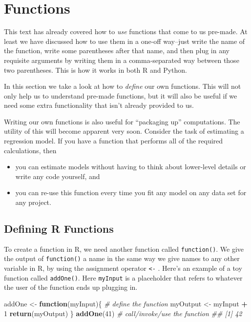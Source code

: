 \documentclass[12pt,krantz2]{krantz}
\makeatletter
\newenvironment{Shaded}{\begin{snugshade}}{\end{snugshade}}
\newcommand{\CommentTok}[1]{\textcolor[rgb]{0.37,0.37,0.37}{\textit{#1}}}
\newcommand{\ControlFlowTok}[1]{\textcolor[rgb]{0.27,0.27,0.27}{\textbf{#1}}}
\newcommand{\DecValTok}[1]{\textcolor[rgb]{0.06,0.06,0.06}{#1}}
\newcommand{\KeywordTok}[1]{\textcolor[rgb]{0.27,0.27,0.27}{\textbf{#1}}}
\newcommand{\NormalTok}[1]{#1}
\newcommand{\OperatorTok}[1]{\textcolor[rgb]{0.43,0.43,0.43}{\textbf{#1}}}
\newcommand{\StringTok}[1]{\textcolor[rgb]{0.5,0.5,0.5}{#1}}
\providecommand{\tightlist}{%
  \setlength{\itemsep}{0pt}\setlength{\parskip}{0pt}}
\newenvironment{kframe}{%
\medskip{}
\setlength{\fboxsep}{.8em}
 \def\at@end@of@kframe{}%
 \ifinner\ifhmode%
  \def\at@end@of@kframe{\end{minipage}}%
  \begin{minipage}{\columnwidth}%
 \fi\fi%
 \def\FrameCommand##1{\hskip\@totalleftmargin \hskip-\fboxsep
 \colorbox{shadecolor}{##1}\hskip-\fboxsep
     \hskip-\linewidth \hskip-\@totalleftmargin \hskip\columnwidth}%
 \MakeFramed {\advance\hsize-\width
   \@totalleftmargin\z@ \linewidth\hsize
   \@setminipage}}%
 {\par\unskip\endMakeFramed%
 \at@end@of@kframe}
\renewenvironment{Shaded}{\begin{kframe}}{\end{kframe}}
\makeatother
\begin{document}
\hypertarget{functions}{%
\chapter{Functions}\label{functions}}

This text has already covered how to \emph{use} functions that come to us pre-made. At least we have discussed how to use them in a one-off way--just write the name of the function, write some parentheses after that name, and then plug in any requisite arguments by writing them in a comma-separated way between those two parentheses. This is how it works in both R and Python.

In this section we take a look at how to \emph{define} our own functions. This will not only help us to understand pre-made functions, but it will also be useful if we need some extra functionality that isn't already provided to us.

Writing our own functions is also useful for ``packaging up'' computations. The utility of this will become apparent very soon. Consider the task of estimating a regression model. If you have a function that performs all of the required calculations, then

\begin{itemize}
\tightlist
\item
  you can estimate models without having to think about lower-level details or write any code yourself, and
\item
  you can re-use this function every time you fit any model on any data set for any project.
\end{itemize}

\hypertarget{defining-r-functions}{%
\section{Defining R Functions}\label{defining-r-functions}}

To create a function in R, we need another function called \texttt{function()}. We give the output of \texttt{function()} a name in the same way we give names to any other variable in R, by using the assignment operator \texttt{\textless{}-} . Here's an example of a toy function called \texttt{addOne()}. Here \texttt{myInput} is a placeholder that refers to whatever the user of the function ends up plugging in.

\begin{Shaded}
\begin{Highlighting}[]
\NormalTok{addOne <-}\StringTok{ }\ControlFlowTok{function}\NormalTok{(myInput)\{  }\CommentTok{# define the function}
\NormalTok{  myOutput <-}\StringTok{ }\NormalTok{myInput }\OperatorTok{+}\StringTok{ }\DecValTok{1}
  \KeywordTok{return}\NormalTok{(myOutput)}
\NormalTok{\}}
\KeywordTok{addOne}\NormalTok{(}\DecValTok{41}\NormalTok{) }\CommentTok{# call/invoke/use the function }
\CommentTok{## [1] 42}
\end{Highlighting}
\end{Shaded}
\end{document}
